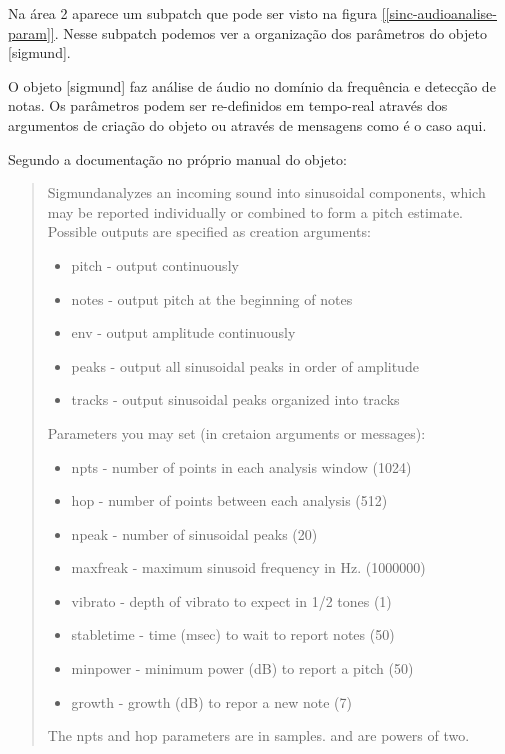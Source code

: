 \documentclass{ppgmus}
\begin{document}
Na área 2 aparece um subpatch que pode ser visto na figura
\ref{[sinc-audioanalise-param]}. Nesse subpatch podemos ver 
a organização dos parâmetros do objeto [sigmund\texttildelow].

O objeto [sigmund\texttildelow] faz análise de áudio no domínio da 
frequência e detecção de notas. Os parâmetros podem ser re-definidos
em tempo-real através dos argumentos de criação do objeto ou através
de mensagens como é o caso aqui.


Segundo a documentação no próprio manual do objeto:

\begin{quote}
 Sigmund\texttildelow analyzes an incoming sound into sinusoidal
components, which may be reported individually or combined to
form a pitch estimate. Possible outputs are specified as creation
arguments:

\begin{itemize}
 \item pitch - output continuously
 \item notes - output pitch at the beginning of notes
 \item env - output amplitude continuously
 \item peaks - output all sinusoidal peaks in order of amplitude
 \item tracks - output sinusoidal peaks organized into tracks
\end{itemize}
Parameters you may set (in cretaion arguments or messages):

\begin{itemize}
 \item npts - number of points in each analysis window (1024)
 \item hop - number of points between each analysis (512)
 \item npeak - number of sinusoidal peaks (20)
 \item maxfreak - maximum sinusoid frequency in Hz. (1000000)
 \item vibrato - depth of vibrato to expect in 1/2 tones (1)
 \item stabletime - time (msec) to wait to report notes (50)
 \item minpower - minimum power (dB) to report a pitch (50)
 \item growth - growth (dB) to repor a new note (7) 
\end{itemize}
The npts and hop parameters are in samples. and are powers of two.
\end{quote} 
\end{document}
